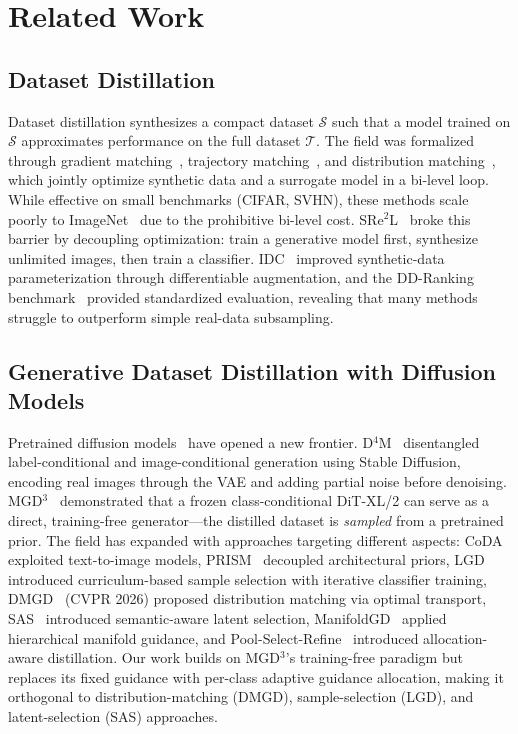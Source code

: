 \section{Related Work}
\label{sec:related-work}

\subsection{Dataset Distillation}
Dataset distillation synthesizes a compact dataset $\mathcal{S}$ such that a model trained on $\mathcal{S}$ approximates performance on the full dataset $\mathcal{T}$. The field was formalized through gradient matching~\cite{zhao2023improved}, trajectory matching~\cite{cazenavette2022dataset}, and distribution matching~\cite{liu2023dream}, which jointly optimize synthetic data and a surrogate model in a bi-level loop. While effective on small benchmarks (CIFAR, SVHN), these methods scale poorly to ImageNet~\cite{russakovsky2014imagenet} due to the prohibitive bi-level cost. SRe$^2$L~\cite{yin2023squeeze} broke this barrier by decoupling optimization: train a generative model first, synthesize unlimited images, then train a classifier. IDC~\cite{kim2022dataset} improved synthetic-data parameterization through differentiable augmentation, and the DD-Ranking benchmark~\cite{li2025ddranking} provided standardized evaluation, revealing that many methods struggle to outperform simple real-data subsampling.

\subsection{Generative Dataset Distillation with Diffusion Models}
Pretrained diffusion models~\cite{ho2020denoising, peebles2022scalable} have opened a new frontier. D$^4$M~\cite{su2024dataset} disentangled label-conditional and image-conditional generation using Stable Diffusion, encoding real images through the VAE and adding partial noise before denoising. MGD$^3$~\cite{chansantiago2025modeguided} demonstrated that a frozen class-conditional DiT-XL/2 can serve as a direct, training-free generator---the distilled dataset is \emph{sampled} from a pretrained prior. The field has expanded with approaches targeting different aspects: CoDA~\cite{zhou2025coda} exploited text-to-image models, PRISM~\cite{moser2025prism} decoupled architectural priors, LGD~\cite{chansantiago2026learnabilityguided} introduced curriculum-based sample selection with iterative classifier training, DMGD~\cite{wang2026dmgd} (CVPR 2026) proposed distribution matching via optimal transport, SAS~\cite{li2026semanticaware} introduced semantic-aware latent selection, ManifoldGD~\cite{roy2026manifoldgd} applied hierarchical manifold guidance, and Pool-Select-Refine~\cite{li2026poolselectrefine} introduced allocation-aware distillation. Our work builds on MGD$^3$'s training-free paradigm but replaces its fixed guidance with per-class adaptive guidance allocation, making it orthogonal to distribution-matching (DMGD), sample-selection (LGD), and latent-selection (SAS) approaches.

